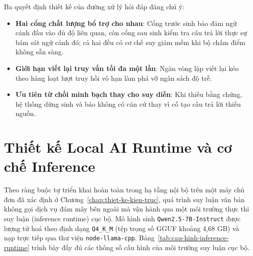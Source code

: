 Ba quyết định thiết kế của đường xử lý hỏi đáp đáng chú ý:
\begin{itemize}
    \item[--] \textbf{Hai cổng chất lượng bổ trợ cho nhau}: Cổng trước sinh bảo đảm ngữ cảnh đầu vào đủ độ liên quan, còn cổng sau sinh kiểm tra câu trả lời thực sự bám sát ngữ cảnh đó; cả hai đều có cơ chế suy giảm mềm khi bộ chấm điểm không sẵn sàng.
    \item[--] \textbf{Giới hạn viết lại truy vấn tối đa một lần}: Ngăn vòng lặp viết lại kéo theo hàng loạt lượt truy hồi vô hạn làm phá vỡ ngân sách độ trễ.
    \item[--] \textbf{Ưu tiên từ chối minh bạch thay cho suy diễn}: Khi thiếu bằng chứng, hệ thống dừng sinh và báo không có căn cứ thay vì cố tạo câu trả lời thiếu nguồn.
\end{itemize}

\section{Thiết kế Local AI Runtime và cơ chế Inference}
\label{sec:local-ai-runtime}

Theo ràng buộc tự triển khai hoàn toàn trong hạ tầng nội bộ trên một máy chủ đơn đã xác định ở Chương~\ref{chap:thiet-ke-kien-truc}, quá trình suy luận văn bản không gọi dịch vụ đám mây bên ngoài mà vận hành qua một môi trường thực thi suy luận (inference runtime) cục bộ. Mô hình sinh \texttt{Qwen2.5-7B-Instruct} được lượng tử hoá theo định dạng \texttt{Q4\_K\_M} (tệp trọng số GGUF khoảng 4,68 GB) và nạp trực tiếp qua thư viện \texttt{node-llama-cpp}. Bảng~\ref{tab:cau-hinh-inference-runtime} trình bày đầy đủ các thông số cấu hình của môi trường suy luận cục bộ.

